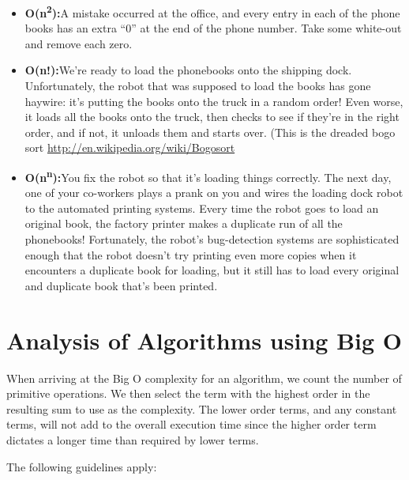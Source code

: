 \begin{displayquote}
\begin{itemize}
	\item \textbf{{O(n}\textsuperscript{{2}}{):}}{A mistake occurred at the
office, and every entry in each of the phone books has an extra ``0'' at
the end of the phone number. Take some white-out and remove each zero.}

	\item \textbf{{O(n!):}}{{}}{We're ready to load the phonebooks onto
the shipping dock. Unfortunately, the robot that was supposed to load
the books has gone haywire: it's putting the books onto the truck in a
random order! Even worse, it loads all the books onto the truck, then
checks to see if they're in the right order, and if not, it unloads them
and starts over. (This is the
dreaded bogo sort} \url{http://en.wikipedia.org/wiki/Bogosort}

	\item \textbf{{O(n}\textsuperscript{{n}}{):}}{{}}{You fix the robot so
that it's loading things correctly. The next day, one of your co-workers
plays a prank on you and wires the loading dock robot to the automated
printing systems. Every time the robot goes to load an original book,
the factory printer makes a duplicate run of all the phonebooks!
Fortunately, the robot's bug-detection systems are sophisticated enough
that the robot doesn't try printing even more copies when it encounters
a duplicate book for loading, but it still has to load every original
and duplicate book that's been printed.\\
}

\end{itemize}
\end{displayquote}



\section {Analysis of Algorithms using Big O}

When arriving at the Big O complexity for an algorithm, we count the number of primitive operations.  We then select the term with the highest order in the resulting sum to use as the complexity.    The lower order terms, and any constant terms, will not add to the overall execution time since the higher order term dictates a longer time than required by lower terms.

The following guidelines apply:

